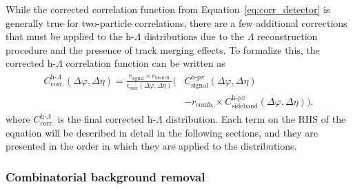 While the corrected correlation function from Equation~\ref{eq:corr_detector} is generally true for two-particle correlations, there are a few additional corrections that must be applied to the h-$\Lambda$ distributions due to the $\Lambda$ reconstruction procedure and the presence of track merging effects. To formalize this, the corrected h-$\Lambda$ correlation function can be written as
%
\begin{align}
	\begin{split}
		C_{\text{corr.}}^{\text{h-}\Lambda}(\Delta\varphi, \Delta\eta) = \frac{r_{\text{signal}} \times r_{\text{branch}}}{\epsilon_{\text{pair}}(\Delta\varphi, \Delta\eta)}\biggl(&C_{\text{signal}}^{\text{h-p}\pi}(\Delta\varphi, \Delta\eta)\\
		&- r_{\text{comb.}} \times C_{\text{sideband}}^{\text{h-p}\pi}(\Delta\varphi, \Delta\eta)\biggr),
	\end{split}
	\label{eq:lambda_corr}
\end{align}
%
where $C_{\text{corr.}}^{\text{h-}\Lambda}$ is the final corrected h-$\Lambda$ distribution. Each term on the RHS of the equation will be described in detail in the following sections, and they are presented in the order in which they are applied to the distributions.

\subsubsection{Combinatorial background removal}
\label{sec:comb_bg_removal}

